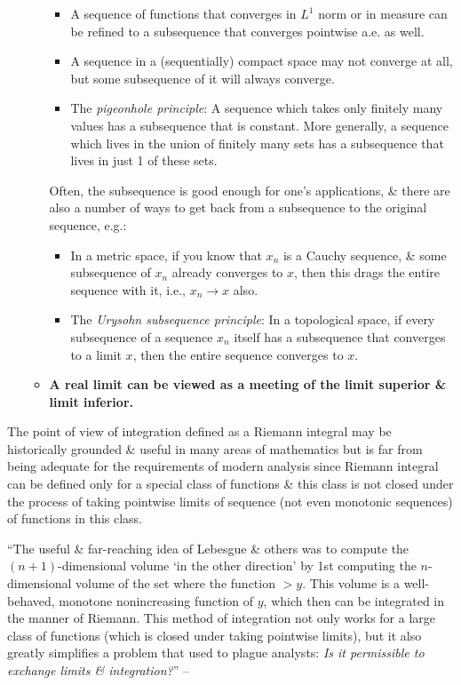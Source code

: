 \documentclass{article}
\begin{document}
\begin{enumerate}
\begin{itemize}
\begin{itemize}
			\item A sequence of functions that converges in $L^1$ norm or in measure can be refined to a subsequence that converges pointwise a.e. as well.
			\item A sequence in a (sequentially) compact space may not converge at all, but some subsequence of it will always converge.
			\item The {\it pigeonhole principle}: A sequence which takes only finitely many values has a subsequence that is constant. More generally, a sequence which lives in the union of finitely many sets has a subsequence that lives in just 1 of these sets.
		\end{itemize}
		Often, the subsequence is good enough for one's applications, \& there are also a number of ways to get back from a subsequence to the original sequence, e.g.:
		\begin{itemize}
			\item In a metric space, if you know that $x_n$ is a Cauchy sequence, \& some subsequence of $x_n$ already converges to $x$, then this drags the entire sequence with it, i.e., $x_n\to x$ also.
			\item The {\it Urysohn subsequence principle}: In a topological space, if every subsequence of a sequence $x_n$ itself has a subsequence that converges to a limit $x$, then the entire sequence converges to $x$.
		\end{itemize}
		\item {\bf A real limit can be viewed as a meeting of the limit superior \& limit inferior.}		
	\end{itemize}
\end{enumerate}
The point of view of integration defined as a Riemann integral may be historically grounded \& useful in many areas of mathematics but is far from being adequate for the requirements of modern analysis since Riemann integral can be defined only for a special class of functions \& this class is not closed under the process of taking pointwise limits of sequence (not even monotonic sequences) of functions in this class.

``The useful \& far-reaching idea of Lebesgue \& others was to compute the $(n + 1)$-dimensional volume `in the other direction' by 1st computing the $n$-dimensional volume of the set where the function $> y$. This volume is a well-behaved, monotone nonincreasing function of $y$, which then can be integrated in the manner of Riemann. This method of integration not only works for a large class of functions (which is closed under taking pointwise limits), but it also greatly simplifies a problem that used to plague analysts: {\it Is it permissible to exchange limits \& integration?}'' -- \cite[Chap. 1, pp. 1--2]{Lieb_Loss2001}
\end{document}
